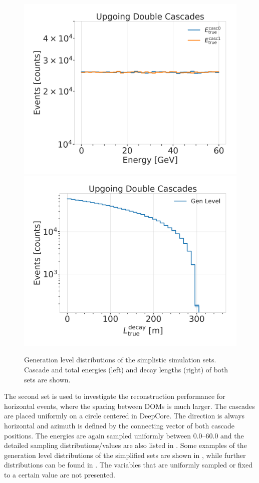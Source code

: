 \begin{figure}[h]
    \centering
    \includegraphics[width=.49\linewidth]{figures/model_independent_simulation/gen_level/1_d_distr_energies_clipped.png}
    \includegraphics[width=.49\linewidth]{figures/model_independent_simulation/gen_level/1_d_distr_true_decay_length_clipped.png}
    \caption[Simplified model independent simulation generation level distributions]{Generation level distributions of the simplistic simulation sets. Cascade and total energies (left) and decay lengths (right) of both sets are shown.}
\end{figure}    


The second set is used to investigate the reconstruction performance for horizontal events, where the spacing between DOMs is much larger. The cascades are placed uniformly on a circle centered in DeepCore. The direction is always horizontal and azimuth is defined by the connecting vector of both cascade positions. The energies are again sampled uniformly between \SIrange[range-phrase={~and~}]{0.0}{60.0}{\gev} and the detailed sampling distributions/values are also listed in . Some examples of the generation level distributions of the simplified sets are shown in , while further distributions can be found in . The variables that are uniformly sampled or fixed to a certain value are not presented.


